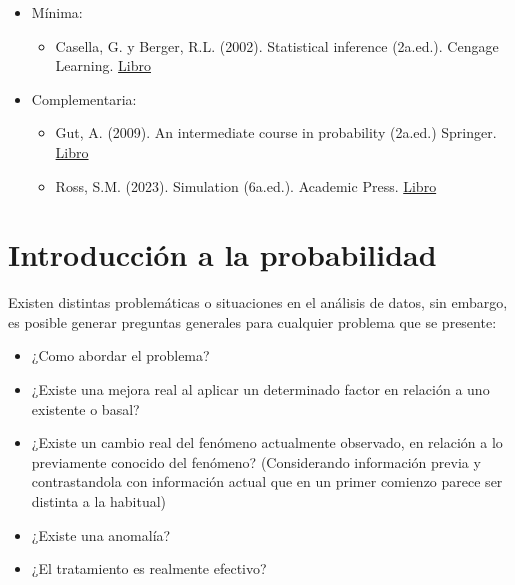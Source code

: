 \documentclass[
  letterpaper,
  DIV=11,
  numbers=noendperiod]{scrreprt}
\providecommand{\tightlist}{%
  \setlength{\itemsep}{0pt}\setlength{\parskip}{0pt}}
\begin{document}
\begin{itemize}
\tightlist
\item
  Mínima:

  \begin{itemize}
  \tightlist
  \item
    Casella, G. y Berger, R.L. (2002). Statistical inference (2a.ed.).
    Cengage Learning.
    \href{https://drive.google.com/file/d/1ngxF_UTLxBLQcM0bQT6VJPwz60wVkMNV/view?usp=drive_link}{Libro}
  \end{itemize}
\item
  Complementaria:

  \begin{itemize}
  \tightlist
  \item
    Gut, A. (2009). An intermediate course in probability (2a.ed.)
    Springer.
    \href{https://drive.google.com/file/d/1QGeVrche29-WJN6JnBbaT295UWwxnvF-/view?usp=drive_link}{Libro}
  \item
    Ross, S.M. (2023). Simulation (6a.ed.). Academic Press.
    \href{https://drive.google.com/file/d/1ZG5jx-nEwqp8ssY_kc6HC-sW4qMfxbbj/view?usp=drive_link}{Libro}
  \end{itemize}
\end{itemize}


\chapter{Introducción a la
probabilidad}\label{introducciuxf3n-a-la-probabilidad}

Existen distintas problemáticas o situaciones en el análisis de datos,
sin embargo, es posible generar preguntas generales para cualquier
problema que se presente:

\begin{itemize}
\tightlist
\item
  ¿Como abordar el problema?
\item
  ¿Existe una mejora real al aplicar un determinado factor en relación a
  uno existente o basal?
\item
  ¿Existe un cambio real del fenómeno actualmente observado, en relación
  a lo previamente conocido del fenómeno? (Considerando información
  previa y contrastandola con información actual que en un primer
  comienzo parece ser distinta a la habitual)
\item
  ¿Existe una anomalía?
\item
  ¿El tratamiento es realmente efectivo?
\end{itemize}
\end{document}
